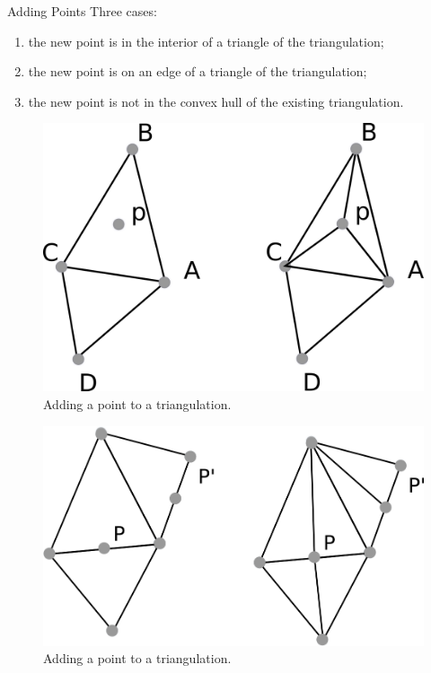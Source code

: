 \documentclass[18pt]{beamer}
\begin{document}
\begin{frame}{Adding Points}
Three cases:

\begin{enumerate}
\item<1-> the new point is in the interior of a triangle of the triangulation;
\item<2-> the new point is on an edge of a triangle of the triangulation;
\item<3-> the new point is not in the convex hull of the existing triangulation.
\end{enumerate}

\begin{overprint}
  \begin{figure}
\centering
\includegraphics[scale=0.8]{adding}
\caption{Adding a point to a triangulation.}
\end{figure}
  
  \begin{figure}
\centering
\includegraphics[scale=0.8]{adding2}
\caption{Adding a point to a triangulation.}
\end{figure}
  

\end{overprint}
\end{frame}
\end{document}
